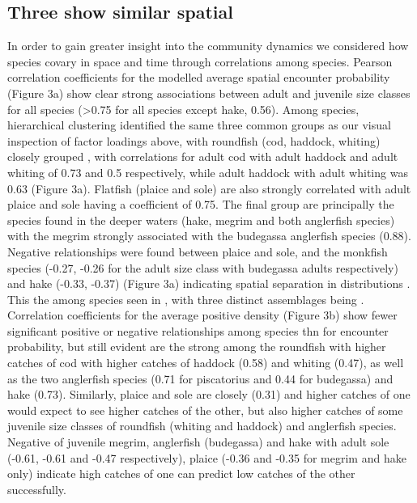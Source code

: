 \documentclass[fleqn,10pt]{wlscirep}
\begin{document}
\begin{linenumbers}
\subsection*{Three  show similar spatial
	\\} In order to gain greater
insight into the community dynamics we considered how species covary in space
and time through correlations among species.  Pearson correlation coefficients
for the modelled average spatial encounter probability (Figure 3a) show clear
strong associations between adult and juvenile size classes for all species
(\textgreater 0.75 for all species except hake, 0.56).  Among species,
hierarchical clustering identified the same three common
groups as our visual inspection of factor loadings
above, with roundfish (cod, haddock, whiting) closely grouped
, with correlations for adult cod with
adult haddock and adult whiting of 0.73 and 0.5 respectively, while adult
haddock with adult whiting was 0.63 (Figure 3a). Flatfish (plaice and sole) are
also strongly correlated with adult plaice and sole having a coefficient of
0.75.  The final group are principally the species found in the deeper waters
(hake, megrim and both anglerfish species) with the megrim strongly associated
with the budegassa anglerfish species (0.88). Negative relationships were found
between plaice and sole, and the monkfish species (-0.27, -0.26 for the adult
size class with budegassa adults respectively) and hake (-0.33, -0.37) (Figure
3a) indicating spatial separation in distributions . This
 the
 among species seen in
 , with three distinct assemblages being
.\\

Correlation coefficients for the average positive density (Figure 3b) show
fewer significant positive or negative relationships among species thn for
encounter probability, but still evident are the strong
 among the roundfish with higher
catches of cod  
with higher catches of haddock (0.58) and whiting (0.47), as well as the two
anglerfish species (0.71 for piscatorius and 0.44 for budegassa) and hake
(0.73). Similarly, plaice and sole are closely
 (0.31) and higher catches of one would
expect to see higher catches of the other, but also higher catches of some
juvenile size classes of roundfish (whiting and haddock) and anglerfish
species. Negative  of juvenile
megrim, anglerfish (budegassa) and hake with adult sole (-0.61, -0.61 and -0.47
respectively), plaice (-0.36 and -0.35 for megrim and hake only) indicate high
catches of one can predict low catches of the other successfully.\\


\end{linenumbers}
\end{document}
